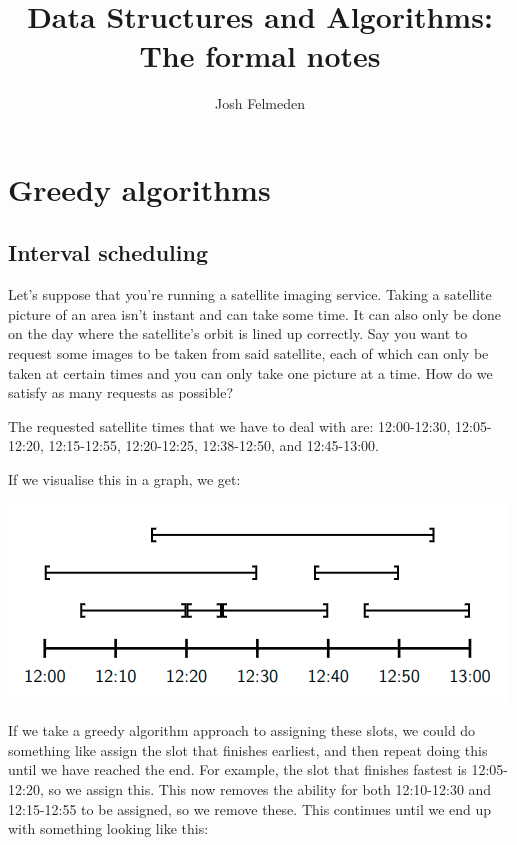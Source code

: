 \documentclass[11pt,a4paper,titlepage,dvipsnames,cmyk]{scrartcl}
\title{Data Structures and Algorithms: The formal notes}
\author{Josh Felmeden}
\begin{document}
\maketitle
\tableofcontents

\newpage
\section{Greedy algorithms}%
\label{sec:Greedy algorithms}
\subsection{Interval scheduling}%
\label{sub:interval-scheduling}
Let's suppose that you're running a satellite imaging service. Taking a
satellite picture of an area isn't instant and can take some time. It can
also only be done on the day where the satellite's orbit is lined up
correctly. Say you want to request some images to be taken from said
satellite, each of which can only be taken at certain times and you can
only take one picture at a time. How do we satisfy as many requests as
possible?

The requested satellite times that we have to deal with are: 12:00-12:30,
12:05-12:20, 12:15-12:55, 12:20-12:25, 12:38-12:50, and 12:45-13:00.

If we visualise this in a graph, we get: 


\begin{center}
    \includegraphics[scale=.5]{graph-satellite.png}
\end{center}

If we take a greedy algorithm approach to assigning these slots, we could
do something like assign the slot that finishes earliest, and then repeat
doing this until we have reached the end. For example, the slot that
finishes fastest is 12:05-12:20, so we assign this. This now removes the
ability for both 12:10-12:30 and 12:15-12:55 to be assigned, so we remove
these. This continues until we end up with something looking like this:
\end{document}
